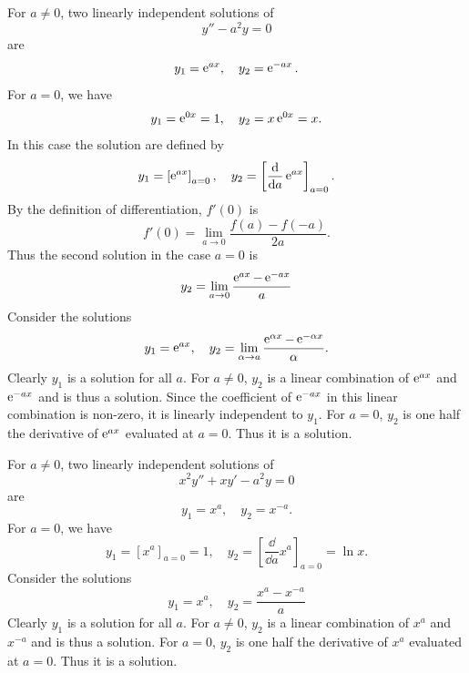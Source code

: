{%
\begin{Solution}
  \label{solution y1=eax}
  For $a \neq 0$, two linearly independent solutions of
  \[
  y'' - a^2 y = 0
  \]
  are 
  \[
  y_1 = \mathop{\mathrm{e}}\nolimits^{a x}, \quad y_2 = \mathop{\mathrm{e}}\nolimits^{-a x}.
  \]
  For $a = 0$, we have
  \[
  y_1 = \mathop{\mathrm{e}}\nolimits^{0 x} = 1, \quad y_2 = x \mathop{\mathrm{e}}\nolimits^{0 x} = x.
  \]
  In this case the solution are defined by
  \[
  y_1 = \left[\mathop{\mathrm{e}}\nolimits^{a x} \right]_{a = 0}, \quad
  y_2 = \left[\frac{\mathrm{d}}{\mathrm{d} a} \mathop{\mathrm{e}}\nolimits^{a x} \right]_{a = 0}.
  \]
  By the definition of differentiation, $f'(0)$ is 
  \[
  f'(0) = \lim_{a \to 0} \frac{f(a) - f(-a)}{2a}.
  \]
  Thus the second solution in the case $a = 0$ is
  \[
  y_2 = \lim_{a \to 0} \frac{\mathop{\mathrm{e}}\nolimits^{a x} - \mathop{\mathrm{e}}\nolimits^{-a x}}{a}
  \]
  Consider the solutions
  \[
  y_1 = \mathop{\mathrm{e}}\nolimits^{a x}, \quad
  y_2 = \lim_{\alpha \to a} \frac{\mathop{\mathrm{e}}\nolimits^{\alpha x} - \mathop{\mathrm{e}}\nolimits^{-\alpha x}}{\alpha}.
  \]
  Clearly $y_1$ is a solution for all $a$.  For $a \neq 0$, $y_2$ is a linear
  combination of $\mathop{\mathrm{e}}\nolimits^{a x}$ and $\mathop{\mathrm{e}}\nolimits^{-a x}$ and is thus a solution.  
  Since the coefficient of $\mathop{\mathrm{e}}\nolimits^{-a x}$ in this linear combination is non-zero,
  it is linearly independent to $y_1$.  For $a = 0$, $y_2$ is one half
  the derivative of $\mathop{\mathrm{e}}\nolimits^{a x}$ evaluated at $a = 0$.  Thus it is a solution.


  For $a \neq 0$, two linearly independent solutions of
  \[
  x^2 y'' + x y' - a^2 y = 0
  \]
  are 
  \[
  y_1 = x^a, \quad y_2 = x^{-a}.
  \]
  For $a = 0$, we have
  \[
  y_1 = \left[ x^a \right]_{a = 0} = 1, \quad 
  y_2 = \left[ \frac{\dd}{\dd a} x^a \right]_{a = 0} = \ln x.
  \]
  Consider the solutions
  \[
  y_1 = x^a, \quad
  y_2 = \frac{x^a - x^{-a}}{a}
  \]
  Clearly $y_1$ is a solution for all $a$.  For $a \neq 0$, $y_2$ is a linear
  combination of $x^a$ and $x^{-a}$ and is thus a solution.  
  For $a = 0$, $y_2$ is one half the derivative of $x^a$ evaluated at $a = 0$.  
  Thus it is a solution.
\end{Solution}








}
